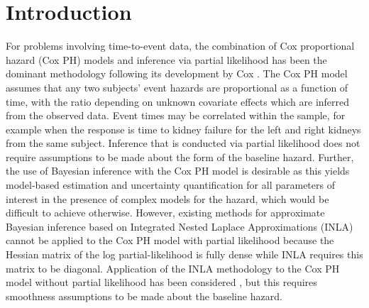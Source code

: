 \documentclass[ba]{imsart}
\begin{document}






%


\section{Introduction}\label{sec1}
For problems involving time-to-event data, the combination of Cox proportional hazard (Cox PH) models and inference via partial likelihood has been the dominant methodology following its development by Cox \citep{coxph}. The Cox PH model assumes that any two subjects' event hazards are proportional as a function of time, with the ratio depending on unknown covariate effects which are inferred from the observed data. Event times may be correlated within the sample, for example when the response is time to kidney failure for the left and right kidneys from the same subject. Inference that is conducted via partial likelihood does not require assumptions to be made about the form of the baseline hazard. Further, the use of Bayesian inference with the Cox PH model is desirable as this yields model-based estimation and uncertainty quantification for all parameters of interest in the presence of complex models for the hazard, which would be difficult to achieve otherwise. However, existing methods for approximate Bayesian inference based on Integrated Nested Laplace Approximations (INLA) \citep{inla} cannot be applied to the Cox PH model with partial likelihood because the Hessian matrix of the log partial-likelihood is fully dense while INLA requires this matrix to be diagonal. Application of the INLA methodology to the Cox PH model without partial likelihood has been considered \citep{inlacoxph}, but this requires smoothness assumptions to be made about the baseline hazard.
\end{document}
